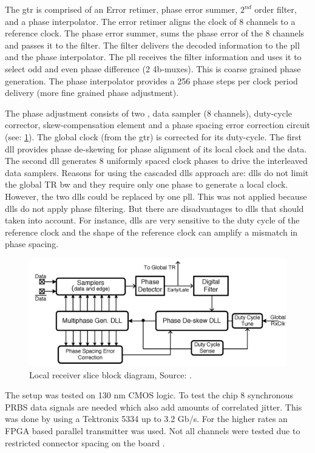 The \ac{gtr} is comprised of an Error retimer, phase error summer, $2^{nd}$ order filter,  and a phase interpolator.
The error retimer aligns the clock of 8 channels to a reference clock.
The phase error summer, sums the phase error of the 8 channels and passes it to the filter.
The filter delivers the decoded information to the \ac{pll} and the phase interpolator.
The \ac{pll} receives the filter information and uses it to select odd and even phase difference (2 4b-muxes).
This is coarse grained phase generation.
The phase interpolator provides a 256 phase steps per clock period delivery (more fine grained phase adjustment).

The phase adjustment consists of two , data sampler (8 channels), duty-cycle corrector, skew-compensation element and a phase spacing error correction circuit (see: \cref{fig:rep1:receiver}).
The global clock (from the \ac{gtr}) is corrected for its duty-cycle.
The first \ac{dll} provides phase de-skewing for phase alignment of its local clock and the data.
The second \ac{dll} generates 8 uniformly spaced clock phases to drive the interleaved data samplers.
Reasons for using the cascaded \acsp{dll} approach are: \acsp{dll} do not limit the global TR \ac{bw} and they require only one phase to generate a local clock.
However, the two \acsp{dll} could be replaced by one \ac{pll}.
This was not applied because \acsp{dll} do not apply phase filtering. 
But there are disadvantages to \acsp{dll} that should taken into account.
For instance, \acsp{dll} are very sensitive to the duty cycle of the reference clock and the shape of the reference clock can amplify a mismatch in phase spacing.

\begin{figure}	
    \centering
	\includegraphics[width=0.99\linewidth]{Figures/Rep1ReceiverSlice.png}
	\caption{Local receiver slice block diagram, Source: \cite{agrawal20098}.} 
    \label{fig:rep1:receiver}
\end{figure}
The setup was tested on 130 nm CMOS logic. 
To test the chip 8 synchronous PRBS data signals are needed which also add amounts of correlated jitter.
This was done by using a Tektronix 5334 up to 3.2 Gb/s.
For the higher rates an FPGA based parallel transmitter was used.
Not all channels were tested due to restricted connector spacing on the board .

